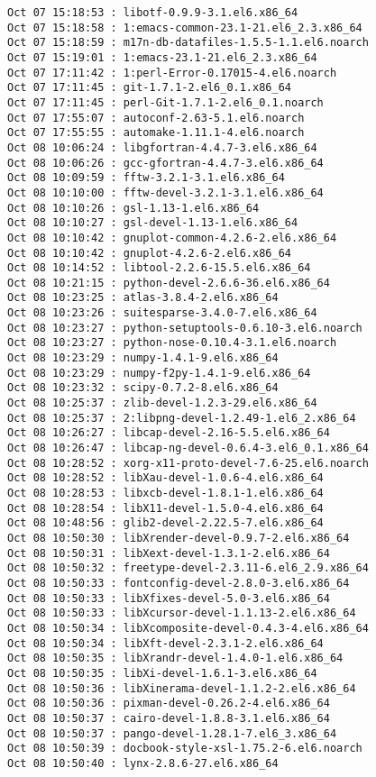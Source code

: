 \documentclass[11pt]{article}
\begin{document}
\begin{verbatim}
Oct 07 15:18:53 : libotf-0.9.9-3.1.el6.x86_64
Oct 07 15:18:58 : 1:emacs-common-23.1-21.el6_2.3.x86_64
Oct 07 15:18:59 : m17n-db-datafiles-1.5.5-1.1.el6.noarch
Oct 07 15:19:01 : 1:emacs-23.1-21.el6_2.3.x86_64
Oct 07 17:11:42 : 1:perl-Error-0.17015-4.el6.noarch
Oct 07 17:11:45 : git-1.7.1-2.el6_0.1.x86_64
Oct 07 17:11:45 : perl-Git-1.7.1-2.el6_0.1.noarch
Oct 07 17:55:07 : autoconf-2.63-5.1.el6.noarch
Oct 07 17:55:55 : automake-1.11.1-4.el6.noarch
Oct 08 10:06:24 : libgfortran-4.4.7-3.el6.x86_64
Oct 08 10:06:26 : gcc-gfortran-4.4.7-3.el6.x86_64
Oct 08 10:09:59 : fftw-3.2.1-3.1.el6.x86_64
Oct 08 10:10:00 : fftw-devel-3.2.1-3.1.el6.x86_64
Oct 08 10:10:26 : gsl-1.13-1.el6.x86_64
Oct 08 10:10:27 : gsl-devel-1.13-1.el6.x86_64
Oct 08 10:10:42 : gnuplot-common-4.2.6-2.el6.x86_64
Oct 08 10:10:42 : gnuplot-4.2.6-2.el6.x86_64
Oct 08 10:14:52 : libtool-2.2.6-15.5.el6.x86_64
Oct 08 10:21:15 : python-devel-2.6.6-36.el6.x86_64
Oct 08 10:23:25 : atlas-3.8.4-2.el6.x86_64
Oct 08 10:23:26 : suitesparse-3.4.0-7.el6.x86_64
Oct 08 10:23:27 : python-setuptools-0.6.10-3.el6.noarch
Oct 08 10:23:27 : python-nose-0.10.4-3.1.el6.noarch
Oct 08 10:23:29 : numpy-1.4.1-9.el6.x86_64
Oct 08 10:23:29 : numpy-f2py-1.4.1-9.el6.x86_64
Oct 08 10:23:32 : scipy-0.7.2-8.el6.x86_64
Oct 08 10:25:37 : zlib-devel-1.2.3-29.el6.x86_64
Oct 08 10:25:37 : 2:libpng-devel-1.2.49-1.el6_2.x86_64
Oct 08 10:26:27 : libcap-devel-2.16-5.5.el6.x86_64
Oct 08 10:26:47 : libcap-ng-devel-0.6.4-3.el6_0.1.x86_64
Oct 08 10:28:52 : xorg-x11-proto-devel-7.6-25.el6.noarch
Oct 08 10:28:52 : libXau-devel-1.0.6-4.el6.x86_64
Oct 08 10:28:53 : libxcb-devel-1.8.1-1.el6.x86_64
Oct 08 10:28:54 : libX11-devel-1.5.0-4.el6.x86_64
Oct 08 10:48:56 : glib2-devel-2.22.5-7.el6.x86_64
Oct 08 10:50:30 : libXrender-devel-0.9.7-2.el6.x86_64
Oct 08 10:50:31 : libXext-devel-1.3.1-2.el6.x86_64
Oct 08 10:50:32 : freetype-devel-2.3.11-6.el6_2.9.x86_64
Oct 08 10:50:33 : fontconfig-devel-2.8.0-3.el6.x86_64
Oct 08 10:50:33 : libXfixes-devel-5.0-3.el6.x86_64
Oct 08 10:50:33 : libXcursor-devel-1.1.13-2.el6.x86_64
Oct 08 10:50:34 : libXcomposite-devel-0.4.3-4.el6.x86_64
Oct 08 10:50:34 : libXft-devel-2.3.1-2.el6.x86_64
Oct 08 10:50:35 : libXrandr-devel-1.4.0-1.el6.x86_64
Oct 08 10:50:35 : libXi-devel-1.6.1-3.el6.x86_64
Oct 08 10:50:36 : libXinerama-devel-1.1.2-2.el6.x86_64
Oct 08 10:50:36 : pixman-devel-0.26.2-4.el6.x86_64
Oct 08 10:50:37 : cairo-devel-1.8.8-3.1.el6.x86_64
Oct 08 10:50:37 : pango-devel-1.28.1-7.el6_3.x86_64
Oct 08 10:50:39 : docbook-style-xsl-1.75.2-6.el6.noarch
Oct 08 10:50:40 : lynx-2.8.6-27.el6.x86_64

\end{verbatim}
\end{document}
